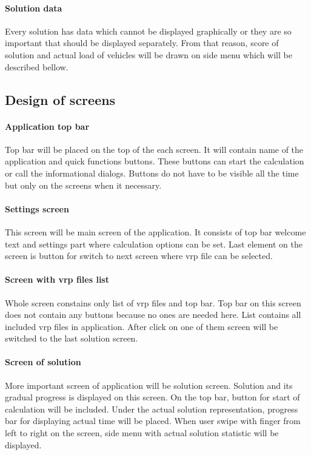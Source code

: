 \paragraph{Solution data}
Every solution has data which cannot be displayed graphically or they are so important that should be displayed
separately. From that reason, score of solution and actual load of vehicles will be drawn on side menu which will be
described bellow.

\subsection{Design of screens}

\paragraph{Application top bar}
Top bar will be placed on the top of the each screen. It will contain name of the application and quick functions
buttons. These buttons can start the calculation or call the informational dialogs. Buttons do not have to be visible
all the time but only on the screens when it necessary.

\paragraph{Settings screen}
This screen will be main screen of the application. It consists of top bar welcome text and settings part where
calculation options can be set. Last element on the screen is button for switch to next screen where vrp file can be
selected.

\paragraph{Screen with vrp files list}
Whole screen constains only list of vrp files and top bar. Top bar on this screen does not contain any buttons because
no ones are needed here. List contains all included vrp files in application. After click on one of them screen will be
switched to the last solution screen.

\paragraph{Screen of solution}
More important screen of application will be solution screen. Solution and its gradual progress is displayed on this
screen. On the top bar, button for start of calculation will be included. Under the actual solution representation,
progress bar for displaying actual time will be placed. When user swipe with finger from left to right on the screen,
side menu with actual solution statistic will be displayed.

